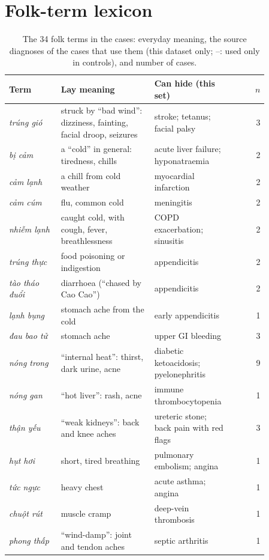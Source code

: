 \documentclass[runningheads]{llncs}
\newcommand{\vi}[1]{\textit{#1}}   %
\begin{document}
\section{Folk-term lexicon}\label{app:lexicon}
\begin{table}[h]\centering\scriptsize
\caption{The 34 folk terms in the cases: everyday meaning, the source diagnoses of the cases that use them (this dataset only; --: used only in controls), and number of cases.}\label{tab:lexicon}
\begin{tabular}{p{0.2\linewidth}p{0.36\linewidth}p{0.3\linewidth}r}\toprule
Term & Lay meaning & Can hide (this set) & $n$ \\\midrule
\vi{trúng gió} & struck by ``bad wind'': dizziness, fainting, facial droop, seizures & stroke; tetanus; facial palsy & 3 \\
\vi{bị cảm} & a ``cold'' in general: tiredness, chills & acute liver failure; hyponatraemia & 2 \\
\vi{cảm lạnh} & a chill from cold weather & myocardial infarction & 2 \\
\vi{cảm cúm} & flu, common cold & meningitis & 2 \\
\vi{nhiễm lạnh} & caught cold, with cough, fever, breathlessness & COPD exacerbation; sinusitis & 2 \\
\vi{trúng thực} & food poisoning or indigestion & appendicitis & 2 \\
\vi{tào tháo đuổi} & diarrhoea (``chased by Cao Cao'') & appendicitis & 2 \\
\vi{lạnh bụng} & stomach ache from the cold & early appendicitis & 1 \\
\vi{đau bao tử} & stomach ache & upper GI bleeding & 3 \\
\vi{nóng trong} & ``internal heat'': thirst, dark urine, acne & diabetic ketoacidosis; pyelonephritis & 9 \\
\vi{nóng gan} & ``hot liver'': rash, acne & immune thrombocytopenia & 1 \\
\vi{thận yếu} & ``weak kidneys'': back and knee aches & ureteric stone; back pain with red flags & 3 \\
\vi{hụt hơi} & short, tired breathing & pulmonary embolism; angina & 1 \\
\vi{tức ngực} & heavy chest & acute asthma; angina & 1 \\
\vi{chuột rút} & muscle cramp & deep-vein thrombosis & 1 \\
\vi{phong thấp} & ``wind-damp'': joint and tendon aches & septic arthritis & 1 \\

\end{tabular}
\end{table}
\end{document}

